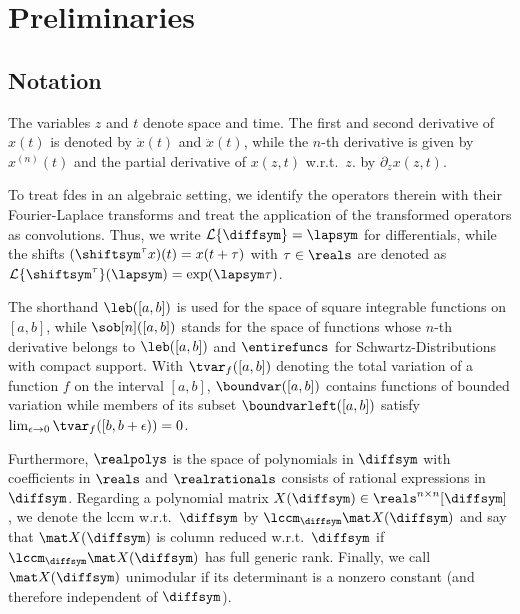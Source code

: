\section{Preliminaries}

\subsection{Notation}

The variables $z$ and $t$ denote space and time.
The first and second derivative of $x(t)$ is denoted
by $\dot x(t)$ and $\ddot x(t)$, while the $n$-th 
derivative is given by $x^{(n)}(t)$
and the partial derivative of $x(z,t)$ w.r.t.~$z$.
by $\partial_z x(z,t)$.


To treat \glspl{fde} in an algebraic setting, we identify the
operators therein with their Fourier-Laplace transforms 
and treat the application of the transformed operators
as convolutions.
Thus, we write $\mathcal{L}\{\diffsym\} = \lapsym$ for
differentials, while  
the shifts
$(\shiftsym^\tau x)(t) = x(t+\tau)$ 
with $\tau \in \reals$
are denoted as
$\mathcal{L}\{\shiftsym^\tau\}(\lapsym) = \exp(\lapsym\tau)$.

The shorthand $\leb([a,b])$ is used for the space of square integrable
functions on $[a,b]$, while $\sob[n]([a,b])$ stands for the space of functions whose $n$-th
derivative belongs to $\leb([a,b])$
and $\entirefuncs$
for Schwartz-Distributions with compact support.
With $\tvar_f([a,b])$ denoting the total variation of a function $f$ on the
interval $[a,b]$, $\boundvar([a,b])$ contains functions of bounded
variation while members of its subset $\boundvarleft([a,b])$ 
satisfy
$\lim_{\epsilon \to 0} \tvar_f([b,b+\epsilon)) = 0$.

Furthermore, $\realpolys$ is the space of polynomials in $\diffsym$ with coefficients in $\reals$
and $\realrationals$ consists of rational expressions in $\diffsym$. 
Regarding a polynomial matrix $X(\diffsym) \in \reals^{n\times n}[\diffsym]$, we denote the \gls{lccm} w.r.t.~$\diffsym$ by $\lccm_{\diffsym}{\mat X(\diffsym)}$ and say that $\mat X(\diffsym)$ is column reduced w.r.t.~$\diffsym$ if $\lccm_{\diffsym}{\mat X(\diffsym)}$ has full generic rank.
Finally, we call $\mat X(\diffsym)$ unimodular if its determinant is a nonzero constant (and therefore independent of $\diffsym$).


